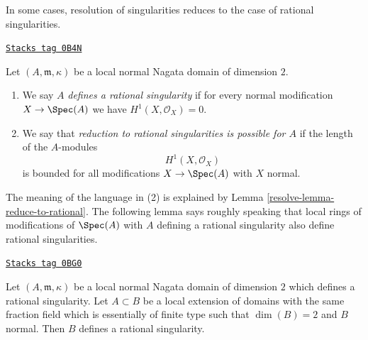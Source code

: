 In some cases, resolution of singularities reduces to the case
of rational singularities.

\begin{definition}
\label{resolve-definition-reduce-to-rational}
\href{https://stacks.math.columbia.edu/tag/0B4N}{\texttt{Stacks tag 0B4N}}

Let $(A, \mathfrak m, \kappa)$ be a local normal Nagata domain
of dimension $2$.
\begin{enumerate}
\item We say $A$ {\it defines a rational singularity} if for every
normal modification $X \to \Spec(A)$ we have $H^1(X, \mathcal{O}_X) = 0$.
\item We say that {\it reduction to rational singularities
is possible for $A$} if the length of the $A$-modules
$$
H^1(X, \mathcal{O}_X)
$$
is bounded for all modifications $X \to \Spec(A)$ with $X$ normal.
\end{enumerate}
\end{definition}

The meaning of the language in (2) is explained by
Lemma \ref{resolve-lemma-reduce-to-rational}. The following lemma
says roughly speaking that local rings of modifications of $\Spec(A)$
with $A$ defining a rational singularity also define rational
singularities.

\begin{lemma}
\label{resolve-lemma-rational-propagates}
\href{https://stacks.math.columbia.edu/tag/0BG0}{\texttt{Stacks tag 0BG0}}

Let $(A, \mathfrak m, \kappa)$ be a local normal Nagata domain of
dimension $2$ which defines a rational singularity. Let $A \subset B$
be a local extension of domains with the same fraction field
which is essentially of finite type such
that $\dim(B) = 2$ and $B$ normal. Then $B$ defines a rational singularity.
\end{lemma}


